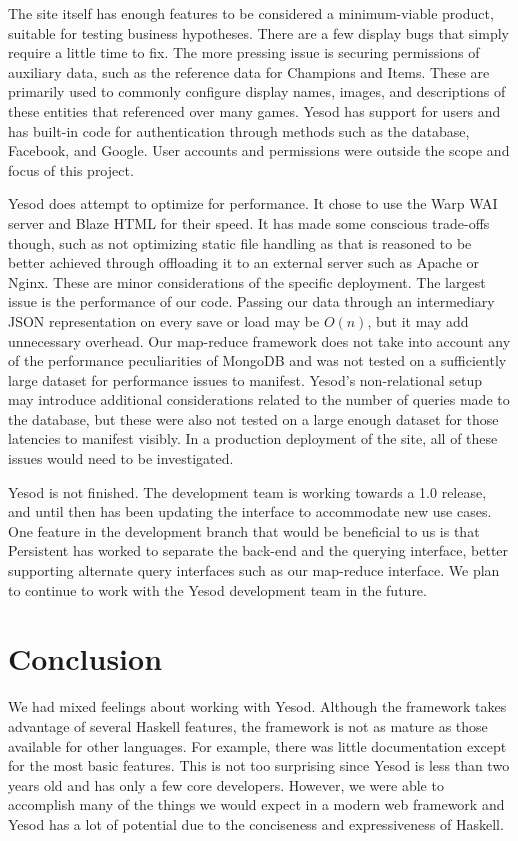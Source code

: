 \documentclass[letterpaper,twocolumn,9pt]{article}
\begin{document}
The site itself has enough features to be considered a minimum-viable product, suitable for testing business hypotheses.  There are a few display bugs that simply require a little time to fix.  The more pressing issue is securing permissions of auxiliary data, such as the reference data for Champions and Items.  These are primarily used to commonly configure display names, images, and descriptions of these entities that referenced over many games.  Yesod has support for users and has built-in code for authentication through methods such as the database, Facebook, and Google.  User accounts and permissions were outside the scope and focus of this project.

Yesod does attempt to optimize for performance.  It chose to use the Warp WAI server and Blaze HTML for their speed.  It has made some conscious trade-offs though, such as not optimizing static file handling as that is reasoned to be better achieved through offloading it to an external server such as Apache or Nginx.  These are minor considerations of the specific deployment.  The largest issue is the performance of our code.  Passing our data through an intermediary JSON representation on every save or load may be $O(n)$, but it may add unnecessary overhead.  Our map-reduce framework does not take into account any of the performance peculiarities of MongoDB and was not tested on a sufficiently large dataset for performance issues to manifest.  Yesod's non-relational setup may introduce additional considerations related to the number of queries made to the database, but these were also not tested on a large enough dataset for those latencies to manifest visibly.  In a production deployment of the site, all of these issues would need to be investigated.

Yesod is not finished.  The development team is working towards a 1.0 release, and until then has been updating the interface to accommodate new use cases.  One feature in the development branch that would be beneficial to us is that Persistent has worked to separate the back-end and the querying interface, better supporting alternate query interfaces such as our map-reduce interface.  We plan to continue to work with the Yesod development team in the future.

\section{Conclusion}
\label{conclusion}

We had mixed feelings about working with Yesod. Although the framework takes advantage of several Haskell features, the framework is not as mature as those available for other languages. For example, there was little documentation except for the most basic features. This is not too surprising since Yesod is less than two years old and has only a few core developers.  However, we were able to accomplish many of the things we would expect in a modern web framework and Yesod has a lot of potential due to the conciseness and expressiveness of Haskell.
\end{document}
